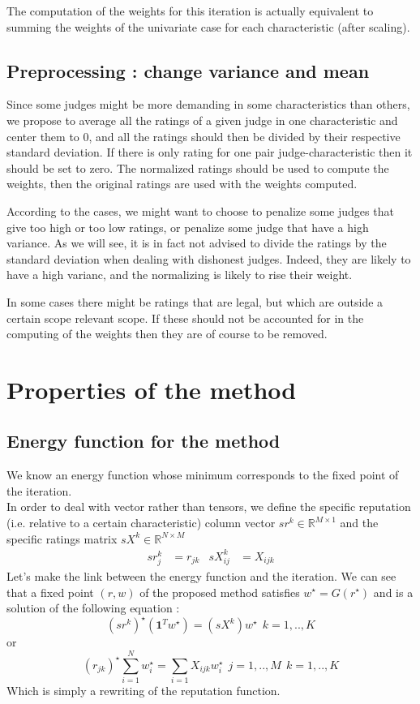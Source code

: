 \documentclass[12pt,a4paper]{article}
\begin{document}
The computation of the weights for this iteration is actually equivalent to summing the weights of the univariate case for each characteristic (after scaling).


\subsection{Preprocessing : change variance and mean}
Since some judges might be more demanding in some characteristics than others, we propose to average all the ratings of a given judge in one characteristic and center them to $0$, and all the ratings should then be divided by their respective standard deviation. If there is only rating for one pair judge-characteristic then it should be set to zero. The normalized ratings should be used to compute the weights, then the original ratings are used with the weights computed.

According to the cases, we might want to choose to penalize some judges that give too high or too low ratings, or penalize some judge that have a high variance. As we will see, it is in fact not advised to divide the ratings by the standard deviation when dealing with dishonest judges. Indeed, they are likely to have a high varianc, and the normalizing is likely to rise their weight.

In some cases there might be ratings that are legal, but which are outside a certain scope relevant scope. If these should not be accounted for in the computing of the weights then they are of course to be removed.


\section{Properties of the method}
\subsection{Energy function for the method}
We know an energy function whose minimum corresponds to the fixed point of the iteration.\\
In order to deal with vector rather than tensors, we define the specific reputation (i.e. relative to a certain characteristic) column vector $ sr^k \in \mathbb{R}^{M\times 1}$ and the specific ratings matrix $sX^k \in \mathbb{R}^{N\times M}$
\begin{align*}
sr^k_{j} &= r_{jk} & sX^k_{ij} &= X_{ijk}
\end{align*}
Let's make the link between the energy function and the iteration. 
We can see that a fixed point $(r,w)$ of the proposed method satisfies $ w^{\star} = G(r^{\star})$ and is a solution of the following equation :
$$ (sr^k)^{\star} (\mathbf{1}^Tw^{\star}) = (sX^k)w^{\star} \:\: k = 1,..,K$$
or 
$$ (r_{jk})^{\star} \sum_{i=1}^N w_i^{\star} = \sum_{i=1} X_{ijk} w_i^{\star} \:\: j = 1,..,M \:\: k = 1,..,K$$
Which is simply a rewriting of the reputation function.
\end{document}
